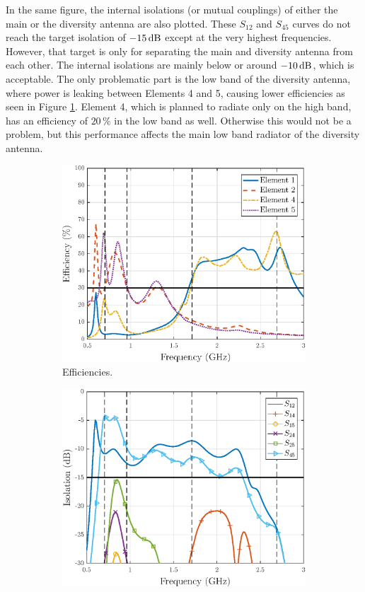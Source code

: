 In the same figure, the internal isolations (or mutual couplings) of either the main or the diversity antenna are also plotted. These $S_{12}$ and $S_{45}$ curves do not reach the target isolation of $-15\,\mathrm{dB}$ except at the very highest frequencies. However, that target is only for separating the main and diversity antenna from each other. The internal isolations are mainly below or around $-10\,\mathrm{dB}$, which is acceptable. The only problematic part is the low band of the diversity antenna, where power is leaking between Elements 4 and 5, causing lower efficiencies as seen in Figure \ref{fig:cellular_final_eff}. Element 4, which is planned to radiate only on the high band, has an efficiency of $20\,\%$ in the low band as well. Otherwise this would not be a problem, but this performance affects the main low band radiator of the diversity antenna.
\begin{figure}[H]
    \centering
    \begin{subfigure}[b]{0.49\textwidth}
        \includegraphics[width=\textwidth]{img/diversity_eff_wgps.eps}
        \caption{Efficiencies.}
        \label{fig:cellular_final_eff}
    \end{subfigure}
    \begin{subfigure}[b]{0.49\textwidth}
        \includegraphics[width=\textwidth]{img/isolation_match_wgps.eps}

\end{subfigure}
\end{figure}
